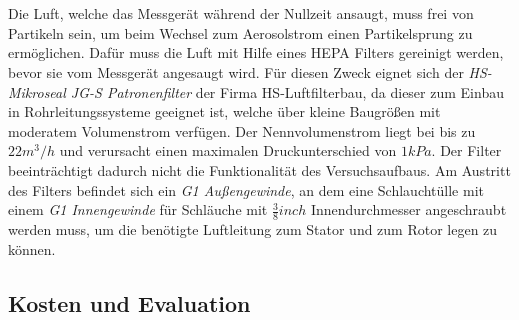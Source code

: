 \\\\
Die Luft, welche das Messgerät während der Nullzeit ansaugt, muss frei von Partikeln sein, um beim Wechsel zum Aerosolstrom einen Partikelsprung zu ermöglichen. Dafür muss die Luft mit Hilfe eines HEPA Filters gereinigt werden, bevor sie vom Messgerät angesaugt wird. Für diesen Zweck eignet sich der \textit{HS-Mikroseal JG-S Patronenfilter} der Firma HS-Luftfilterbau, da dieser zum Einbau in Rohrleitungssysteme geeignet ist, welche über kleine Baugrößen mit moderatem Volumenstrom verfügen. Der Nennvolumenstrom liegt bei bis zu \(22m^3 / h\) und verursacht einen maximalen Druckunterschied von 
\(1 kPa\). Der Filter beeinträchtigt dadurch nicht die Funktionalität des Versuchsaufbaus. Am Austritt des Filters befindet sich ein \textit{G1 Außengewinde}, an dem eine Schlauchtülle mit einem \textit{G1 Innengewinde} für Schläuche mit \(\frac{3}{8} inch\) Innendurchmesser angeschraubt werden muss, um die benötigte Luftleitung zum Stator und zum Rotor legen zu können.
\subsection{Kosten und Evaluation}